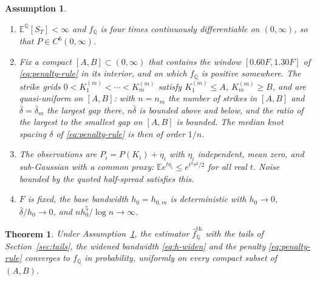 \documentclass[preprint,12pt,authoryear,times]{elsarticle}
\newtheorem{theorem}{Theorem}
\newtheorem{assumption}{Assumption}
\newcommand{\E}{\mathbb{E}}
\newcommand{\Q}{\mathbb{Q}}
\newcommand{\fhat}{\hat f_{\Q}}
\begin{document}
\begin{assumption}
\label{ass:main}
\begin{enumerate}
\item[(i)] \(\E^{\Q}[S_T]<\infty\) and \(f_{\Q}\) is four times continuously differentiable on \((0,\infty)\), so that \(P\in C^6(0,\infty)\).
\item[(ii)] Fix a compact \([A,B]\subset(0,\infty)\) that contains the window \([0.60F,1.30F]\) of \eqref{eq:penalty-rule} in its interior, and on which \(f_{\Q}\) is positive somewhere. The strike grids \(0<K_1^{(m)}<\cdots<K_m^{(m)}\) satisfy \(K_1^{(m)}\le A\), \(K_m^{(m)}\ge B\), and are quasi-uniform on \([A,B]\): with \(n=n_m\) the number of strikes in \([A,B]\) and \(\bar\delta=\bar\delta_m\) the largest gap there, \(n\bar\delta\) is bounded above and below, and the ratio of the largest to the smallest gap on \([A,B]\) is bounded. The median knot spacing \(\delta\) of \eqref{eq:penalty-rule} is then of order \(1/n\).
\item[(iii)] The observations are \(P_i=P(K_i)+\eta_i\) with \(\eta_i\) independent, mean zero, and sub-Gaussian with a common proxy: \(\E e^{t\eta_i}\le e^{t^2\tau^2/2}\) for all real \(t\). Noise bounded by the quoted half-spread satisfies this.
\item[(iv)] \(F\) is fixed, the base bandwidth \(h_0=h_{0,m}\) is deterministic with \(h_0\to 0\), \(\bar\delta/h_0\to 0\), and \(nh_0^5/\log n\to\infty\).
\end{enumerate}
\end{assumption}

\begin{theorem}
\label{thm:cons}
Under Assumption~\ref{ass:main}, the estimator \(\fhat^{\mathrm{th}}\) with the tails of Section~\ref{sec:tails}, the widened bandwidth \eqref{eq:h-widen} and the penalty \eqref{eq:penalty-rule} converges to \(f_{\Q}\) in probability, uniformly on every compact subset of \((A,B)\).
\end{theorem}
\end{document}

